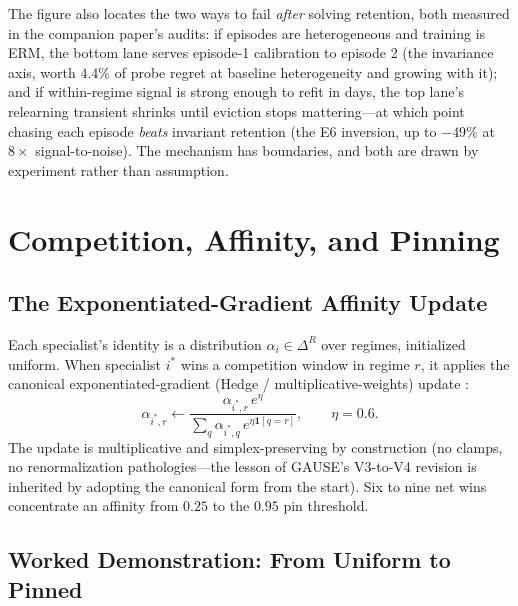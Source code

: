 \documentclass[10pt]{article}
\begin{document}
The figure also locates the two ways to fail \emph{after} solving
retention, both measured in the companion paper's audits: if episodes are
heterogeneous and training is ERM, the bottom lane serves episode-1
calibration to episode 2 (the invariance axis, worth $4.4\%$ of probe
regret at baseline heterogeneity and growing with it); and if
within-regime signal is strong enough to refit in days, the top lane's
relearning transient shrinks until eviction stops mattering---at which
point chasing each episode \emph{beats} invariant retention (the E6
inversion, up to $-49\%$ at $8\times$ signal-to-noise). The mechanism has
boundaries, and both are drawn by experiment rather than assumption.

\section{Competition, Affinity, and Pinning}
\label{sec:competition}

\subsection{The Exponentiated-Gradient Affinity Update}

Each specialist's identity is a distribution $\alpha_i \in \Delta^R$ over
regimes, initialized uniform. When specialist $i^*$ wins a competition
window in regime $r$, it applies the canonical exponentiated-gradient
(Hedge / multiplicative-weights) update
\cite{kivinen1997exponentiated, freund1997decision,
arora2012multiplicative}:
\[
  \alpha_{i^*, r} \leftarrow \frac{\alpha_{i^*, r}\, e^{\eta}}
  {\sum_{q} \alpha_{i^*, q}\, e^{\eta \mathbf{1}[q = r]}},
  \qquad \eta = 0.6 .
\]
The update is multiplicative and simplex-preserving by construction (no
clamps, no renormalization pathologies---the lesson of GAUSE's V3-to-V4
revision is inherited by adopting the canonical form from the start). Six
to nine net wins concentrate an affinity from $0.25$ to the $0.95$ pin
threshold.

\subsection{Worked Demonstration: From Uniform to Pinned}
\end{document}
